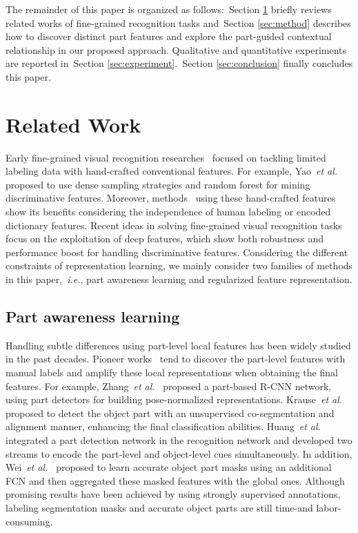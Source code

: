 \documentclass[journal]{IEEEtran}
\def\ie{{\em i.e.}}
\def\etal{{\em et al.}}
\newcommand{\secref}[1]{Section \ref{#1}}
\begin{document}
The remainder of this paper is organized as follows:~\secref{sec:relatedwork} briefly reviews related works of fine-grained recognition tasks and~\secref{sec:method} describes how to discover distinct part features and explore the part-guided contextual relationship in our proposed approach. Qualitative and quantitative experiments are reported in~\secref{sec:experiment}.~\secref{sec:conclusion} finally concludes this paper.


\section{Related Work}\label{sec:relatedwork}
Early fine-grained visual recognition researches~\cite{yao2011combining,yao2012codebook,lazebnik2006beyond} focused on tackling limited labeling data with hand-crafted conventional features. For example, Yao~\etal~\cite{yao2011combining} proposed to use dense sampling strategies and random forest for mining discriminative features. Moreover, methods~\cite{yao2012codebook} using these hand-crafted features show its benefits considering the independence of human labeling or encoded dictionary features.
Recent ideas in solving fine-grained visual recognition tasks focus on the exploitation of deep features, which show both robustness and performance boost for handling discriminative features. Considering the different constraints of representation learning, we mainly consider two families of methods in this paper,~\ie, part awareness learning and regularized feature representation.

\subsection{Part awareness learning} Handling subtle differences using part-level local features has been widely studied in the past decades. Pioneer works~\cite{zhang2014part,huang2016part,he2017weakly,wei2018mask,he2019part,huang2020interpretable} tend to discover the part-level features with manual labels and amplify these local representations when obtaining the final features. For example, Zhang~\etal~\cite{zhang2014part} proposed a part-based R-CNN network, using part detectors for building pose-normalized representations. Krause~\etal~\cite{krause2015fine} proposed to detect the object part with an unsupervised co-segmentation and alignment manner, enhancing the final classification abilities.
Huang~\etal~\cite{huang2016part} integrated a part detection network in the recognition network and developed two streams to encode the part-level and object-level cues simultaneously.
In addition, Wei~\etal~\cite{wei2018mask} proposed to learn accurate object part masks using an additional FCN and then aggregated these masked features with the global ones. Although promising results have been achieved by using strongly supervised annotations, labeling segmentation masks and accurate object parts are still time-and labor-consuming.
\end{document}
